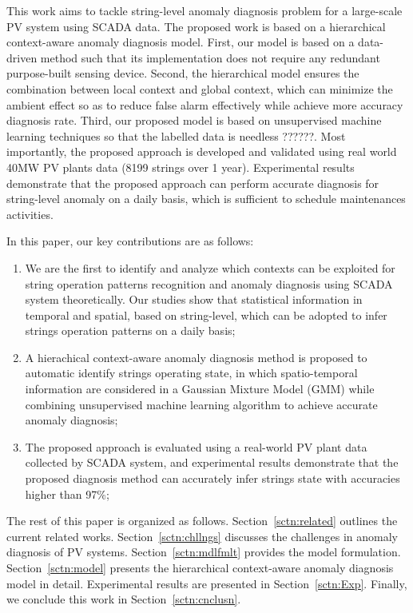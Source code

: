\documentclass[journal]{IEEEtran}
\begin{document}
This work aims to tackle string-level anomaly diagnosis problem for a large-scale PV system using SCADA data. The proposed work is based on a hierarchical context-aware anomaly diagnosis model. First, our model is based on a data-driven method such that its implementation does not require any redundant purpose-built sensing device. Second, the hierarchical model ensures the combination between local context and global context, which can minimize the ambient effect so as to reduce false alarm effectively while achieve more accuracy diagnosis rate. Third, our proposed model is based on unsupervised machine learning techniques so that the labelled data is needless ??????. Most importantly, the proposed approach is developed and validated using real world 40MW PV plants data (8199 strings over 1 year). Experimental results demonstrate that the proposed approach can perform accurate diagnosis for string-level anomaly on a daily basis, which is sufficient to schedule maintenances activities. 

In this paper, our key contributions are as follows:
\begin{enumerate}
\item We are the first to identify and analyze which contexts can be exploited for string operation patterns recognition and anomaly diagnosis using SCADA system theoretically. Our studies show that statistical information in temporal and spatial, based on string-level, which can be adopted to infer strings operation patterns on a daily basis; 
\item A hierachical context-aware anomaly diagnosis method is proposed to automatic identify strings operating state, in which spatio-temporal information are considered in a Gaussian Mixture Model (GMM) while combining unsupervised machine learning algorithm to achieve accurate anomaly diagnosis; 
\item The proposed approach is evaluated using a real-world PV plant data collected by SCADA system, and experimental results demonstrate that the proposed diagnosis method can accurately infer strings state with accuracies higher than \textcolor[rgb]{1,0,0}{97\%}; 
\end{enumerate}

The rest of this paper is organized as follows.
Section~\ref{sctn:related} outlines the current related works.
Section~\ref{sctn:chllngs} discusses the challenges in anomaly diagnosis of PV systems.
Section~\ref{sctn:mdlfmlt} provides the model formulation.
Section~\ref{sctn:model} presents the hierarchical context-aware anomaly diagnosis model in detail.
Experimental results are presented in Section~\ref{sctn:Exp}.
Finally, we conclude this work in Section~\ref{sctn:cnclusn}.
\end{document}

